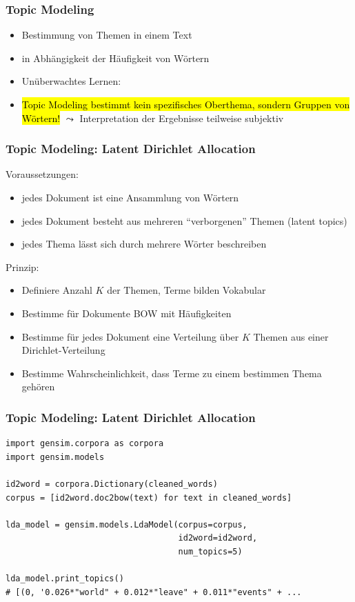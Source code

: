 
\begin{frame}[fragile]
\frametitle{Topic Modeling}

\begin{itemize}
	\item Bestimmung von Themen in einem Text
	\item in Abhängigkeit der Häufigkeit von Wörtern
	\item Unüberwachtes Lernen:
    \item \hl{Topic Modeling bestimmt kein spezifisches Oberthema, sondern Gruppen von Wörtern!} $\leadsto$ Interpretation der Ergebnisse teilweise subjektiv
\end{itemize}
\end{frame}


\begin{frame}
\frametitle{Topic Modeling: Latent Dirichlet Allocation}

Voraussetzungen:
\begin{itemize}
	\item jedes Dokument ist eine Ansammlung von Wörtern
	\item jedes Dokument besteht aus mehreren "`verborgenen"' Themen (latent topics)
	\item jedes Thema lässt sich durch mehrere Wörter beschreiben
\end{itemize}

Prinzip: 
\begin{itemize}
    \item Definiere Anzahl $K$ der Themen, Terme bilden Vokabular
    \item Bestimme für Dokumente BOW mit Häufigkeiten
    \item Bestimme für jedes Dokument eine Verteilung über $K$ Themen aus einer Dirichlet-Verteilung
    \item Bestimme Wahrscheinlichkeit, dass Terme zu einem bestimmen Thema gehören
\end{itemize}   

\end{frame}


\begin{frame}[fragile]
\frametitle{Topic Modeling: Latent Dirichlet Allocation}

\begin{verbatim}
import gensim.corpora as corpora
import gensim.models

id2word = corpora.Dictionary(cleaned_words)
corpus = [id2word.doc2bow(text) for text in cleaned_words]

lda_model = gensim.models.LdaModel(corpus=corpus,
                                   id2word=id2word,
                                   num_topics=5)

lda_model.print_topics()
# [(0, '0.026*"world" + 0.012*"leave" + 0.011*"events" + ...
\end{verbatim}
\end{frame}

